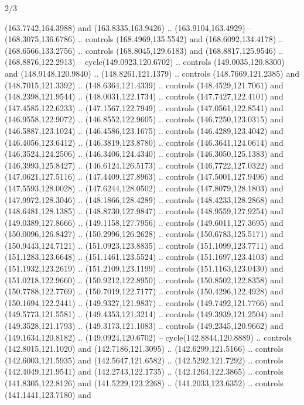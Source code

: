\begin{flagdescription}{2/3}
\begin{scope}[shift={(0.5\flaglength,0.5)},scale=\flagwidth/320]
\begin{scope}[y=0.8pt, x=0.8pt, yscale=-1,shift={(-118.3,-146)}]
  (163.7742,164.3988) and (163.8335,163.9426) .. (163.9104,163.4929) --
  (168.3075,136.6786) .. controls (168.4969,135.5542) and (168.6092,134.4178) ..
  (168.6566,133.2756) .. controls (168.8045,129.6183) and (168.8817,125.9546) ..
  (168.8876,122.2913) -- cycle(149.0923,120.6702) .. controls
  (149.0035,120.8300) and (148.9148,120.9840) .. (148.8261,121.1379) .. controls
  (148.7669,121.2385) and (148.7015,121.3392) .. (148.6364,121.4339) .. controls
  (148.4529,121.7061) and (148.2398,121.9544) .. (148.0031,122.1734) .. controls
  (147.7427,122.4101) and (147.4585,122.6233) .. (147.1567,122.7949) .. controls
  (147.0561,122.8541) and (146.9558,122.9072) .. (146.8552,122.9605) .. controls
  (146.7250,123.0315) and (146.5887,123.1024) .. (146.4586,123.1675) .. controls
  (146.4289,123.4042) and (146.4056,123.6412) .. (146.3819,123.8780) .. controls
  (146.3641,124.0614) and (146.3524,124.2506) .. (146.3406,124.4340) .. controls
  (146.3050,125.1383) and (146.3993,125.8427) .. (146.6124,126.5173) .. controls
  (146.7722,127.0322) and (147.0621,127.5116) .. (147.4409,127.8963) .. controls
  (147.5001,127.9496) and (147.5593,128.0028) .. (147.6244,128.0502) .. controls
  (147.8079,128.1803) and (147.9972,128.3046) .. (148.1866,128.4289) .. controls
  (148.4233,128.2868) and (148.6481,128.1385) .. (148.8730,127.9847) .. controls
  (148.9559,127.9254) and (149.0389,127.8666) .. (149.1158,127.7956) .. controls
  (149.6011,127.3695) and (150.0096,126.8427) .. (150.2996,126.2628) .. controls
  (150.6783,125.5171) and (150.9443,124.7121) .. (151.0923,123.8835) .. controls
  (151.1099,123.7711) and (151.1283,123.6648) .. (151.1461,123.5524) .. controls
  (151.1697,123.4103) and (151.1932,123.2619) .. (151.2109,123.1199) .. controls
  (151.1163,123.0430) and (151.0218,122.9660) .. (150.9212,122.8950) .. controls
  (150.8502,122.8358) and (150.7788,122.7769) .. (150.7019,122.7177) .. controls
  (150.4296,122.4928) and (150.1694,122.2441) .. (149.9327,121.9837) .. controls
  (149.7492,121.7766) and (149.5773,121.5581) .. (149.4353,121.3214) .. controls
  (149.3939,121.2504) and (149.3528,121.1793) .. (149.3173,121.1083) .. controls
  (149.2345,120.9662) and (149.1634,120.8182) .. (149.0924,120.6702) --
  cycle(142.8844,120.8889) .. controls (142.8015,121.1020) and
  (142.7186,121.3095) .. (142.6299,121.5166) .. controls (142.6003,121.5935) and
  (142.5647,121.6582) .. (142.5292,121.7292) .. controls (142.4049,121.9541) and
  (142.2743,122.1735) .. (142.1264,122.3865) .. controls (141.8305,122.8126) and
  (141.5229,123.2268) .. (141.2033,123.6352) .. controls (141.1441,123.7180) and

\end{scope}
\end{scope}
\end{flagdescription}
